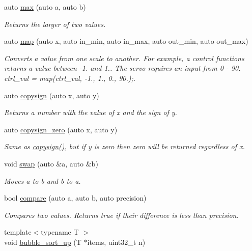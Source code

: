 \begin{DoxyCompactItemize}
auto \hyperlink{namespaceetk_a0b90340a93fcebfc57cb7c5f30bed26d}{max} (auto a, auto b)
\begin{DoxyCompactList}\small\item\em Returns the larger of two values. \end{DoxyCompactList}\item 
auto \hyperlink{namespaceetk_a5c4722af8a58319b06077130fe759644}{map} (auto x, auto in\-\_\-min, auto in\-\_\-max, auto out\-\_\-min, auto out\-\_\-max)
\begin{DoxyCompactList}\small\item\em Converts a value from one scale to another. For example, a control functions returns a value between -\/1. and 1.. The servo requires an input from 0 -\/ 90. ctrl\-\_\-val = map(ctrl\-\_\-val, -\/1., 1., 0., 90.);. \end{DoxyCompactList}\item 
auto \hyperlink{namespaceetk_a29b7cb3d14a2ff168ee94a40797577fe}{copysign} (auto x, auto y)
\begin{DoxyCompactList}\small\item\em Returns a number with the value of x and the sign of y. \end{DoxyCompactList}\item 
auto \hyperlink{namespaceetk_a784f32aa2a3661196e1cf73218c53670}{copysign\-\_\-zero} (auto x, auto y)
\begin{DoxyCompactList}\small\item\em Same as \hyperlink{namespaceetk_a29b7cb3d14a2ff168ee94a40797577fe}{copysign()}, but if y is zero then zero will be returned regardless of x. \end{DoxyCompactList}\item 
void \hyperlink{namespaceetk_ad6c98a88251cf3ccfeabc675507ee871}{swap} (auto \&a, auto \&b)
\begin{DoxyCompactList}\small\item\em Moves a to b and b to a. \end{DoxyCompactList}\item 
bool \hyperlink{namespaceetk_a445cf4f2d0d126c0a1b67891f03408a6}{compare} (auto a, auto b, auto precision)
\begin{DoxyCompactList}\small\item\em Compares two values. Returns true if their difference is less than precision. \end{DoxyCompactList}\item 
{\footnotesize template$<$typename T $>$ }\\void \hyperlink{namespaceetk_abc861c6adcc9b0a83ccca68458756e4d}{bubble\-\_\-sort\-\_\-up} (T $\ast$items, uint32\-\_\-t n)

\end{DoxyCompactItemize}
